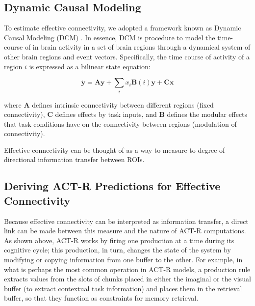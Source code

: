 \documentclass[10pt,letterpaper]{article}
\newcommand{\vct}[1]{\boldsymbol{#1}} %
\newcommand{\mat}[1]{\boldsymbol{#1}} %
\begin{document}
\subsection{Dynamic Causal Modeling}

To estimate effective connectivity, we adopted a framework known as Dynamic Causal Modeling (DCM) \cite{Friston2003, Stocco2018}. In essence, DCM is procedure to model the time-course of in brain activity in a set of brain regions through a dynamical system of other brain regions and event vectors. Specifically, the time course of activity of a region $i$ is expressed as a bilinear state equation:

\begin{equation}
\dot{\vct{y}} = \mat{A}\vct{y} + \sum_{i}x_i\mat{B}(i)\vct{y} + \mat{C}\vct{x}
\label{DCMEquation}
\end{equation}

where $\mat{A}$ defines intrinsic connectivity between different regions (fixed connectivity), $\mat{C}$ defines effects by task inputs, and $\mat{B}$ defines the modular effects that task conditions have on the connectivity between regions (modulation of connectivity). %

Effective connectivity can be thought of as a way to measure to degree of directional information transfer between ROIs.


\subsection{Deriving ACT-R Predictions for Effective Connectivity }

Because effective connectivity can be interpreted as information transfer, a direct link can be made between this measure and the nature of ACT-R computations. As shown above, ACT-R works by firing one production at a time during its cognitive cycle; this production, in turn, changes the state of the system by modifying or copying information from one buffer to the other. For example, in what is perhaps the most common operation in ACT-R models, a production rule extracts values from the slots of chunks placed in either the imaginal or the visual buffer (to extract contextual task information) and places them in the retrieval buffer, so that they function as constraints for memory retrieval.  
\end{document}
